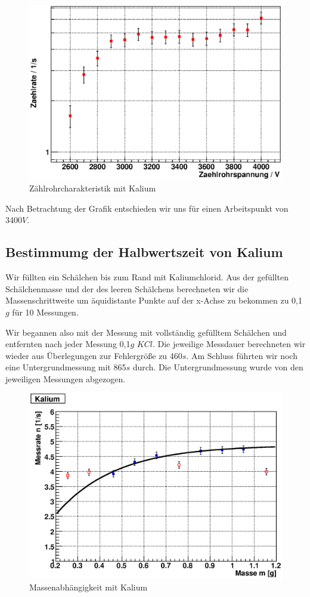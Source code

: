 \documentclass[12pt]{article}
\begin{document}
\begin{figure}[H]  
\centering
\includegraphics[width=0.9\linewidth]{pictures/char_kalium.eps}
\caption{Zählrohrcharakteristik mit Kalium}
\end{figure}

Nach Betrachtung der Grafik entschieden wir uns für einen Arbeitspunkt von 3400$V$.

\subsection{Bestimmumg der Halbwertszeit von Kalium}
Wir füllten ein Schälchen bis zum Rand mit Kaliumchlorid. Aus der gefüllten Schälchenmasse und der des leeren Schälchens berechneten wir die Massenschrittweite um äquidistante Punkte auf der x-Achse zu bekommen zu 0,1$g$ für 10 Messungen.

Wir begannen also mit der Messung mit vollständig gefülltem Schälchen und entfernten nach jeder Messung 0,1$g$ $KCl$. Die jeweilige Messdauer berechneten wir wieder aus Überlegungen zur Fehlergröße zu 460$s$. Am Schluss führten wir noch eine Untergrundmessung mit 865$s$ durch. Die Untergrundmessung wurde von den jeweiligen Messungen abgezogen.

\begin{figure}[H]  
\centering
\includegraphics[width=0.9\linewidth]{pictures/kalium.eps}
\caption{Massenabhängigkeit mit Kalium}
\end{figure}
\end{document}
